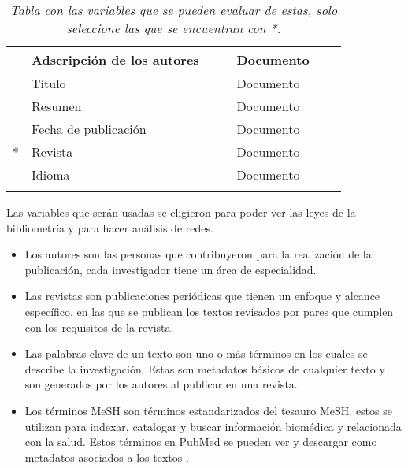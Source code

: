 \begin{longtable}{|p{2cm}|p{2cm}|p{2cm}|p{1.2cm}|p{1.9cm}|p{1.5cm}|p{2.1cm}|}
                  & Adscripción de los autores &                                          &                & Documento        &                &                                                     \\ \hline
                  & Título                     &                                          &                & Documento        &                &                                                     \\ \hline
                  & Resumen                    &                                          &                & Documento        &                &                                                     \\ \hline
                  & Fecha de publicación       &                                          &                & Documento        &                &                                                     \\ \hline
    *             & Revista                    &                                          &                & Documento        &                &                                                     \\ \hline
                  & Idioma                     &                                          &                & Documento        &                &                                                     \\ \hline
\caption{\textit{Tabla con las variables que se pueden evaluar de estas, solo seleccione las que se encuentran con *.}}
\label{tab:variables}
\end{longtable}
Las variables que serán usadas se eligieron para poder ver las leyes de la bibliometría y para hacer análisis de redes.
\begin{itemize}
    \item Los autores son las personas que contribuyeron para la realización de la publicación, 
    cada investigador tiene un área de especialidad.
    \item Las revistas son  publicaciones periódicas que tienen un enfoque y alcance específico, 
    en las que se publican los textos revisados por pares que cumplen con los requisitos de la revista. 
    \item Las palabras clave de un texto son uno o más términos en los cuales se describe la investigación. 
    Estas son metadatos básicos de cualquier texto y son generados por los autores al publicar en una revista.  
    \item Los términos MeSH son términos estandarizados del tesauro MeSH, estos se utilizan para indexar, 
    catalogar y buscar información biomédica y relacionada con la salud. Estos términos en PubMed se pueden ver y 
    descargar como metadatos asociados a los textos \parencite{noauthor_medical_2023}.
\end{itemize}

